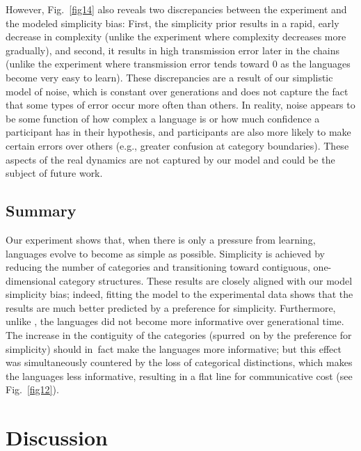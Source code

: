 \documentclass[doc,biblatex]{apa7}
\begin{document}
However, Fig.~\ref{fig14} also reveals two discrepancies between the experiment and the modeled simplicity bias: First, the simplicity prior results in a rapid, early decrease in complexity (unlike the experiment where complexity decreases more gradually), and second, it results in high transmission error later in the chains (unlike the experiment where transmission error tends toward 0 as the languages become very easy to learn). These discrepancies are a result of our simplistic model of noise, which is constant over generations and does not capture the fact that some types of error occur more often than others. In reality, noise appears to be some function of how complex a language is or how much confidence a participant has in their hypothesis, and participants are also more likely to make certain errors over others (e.g., greater confusion at category boundaries). These aspects of the real dynamics are not captured by our model and could be the subject of future work.

\subsection{Summary}

Our experiment shows that, when there is only a pressure from learning, languages evolve to become as simple as possible. Simplicity is achieved by reducing the number of categories and transitioning toward contiguous, one-dimensional category structures. These results are closely aligned with our model simplicity bias; indeed, fitting the model to the experimental data shows that the results are much better predicted by a preference for simplicity. Furthermore, unlike \textcite{Carstensen:2015}, the languages did not become more informative over generational time. The increase in the contiguity of the categories (spurred~on by the preference for simplicity) should in~fact make the languages more informative; but this effect was simultaneously countered by the loss of categorical distinctions, which makes the languages less informative, resulting in a flat line for communicative cost (see Fig.~\ref{fig12}).

\section{Discussion}
\end{document}
